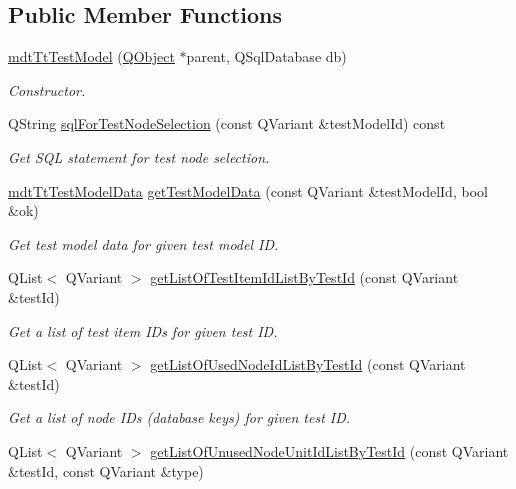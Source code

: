 \subsection*{Public Member Functions}
\begin{DoxyCompactItemize}
\item 
\hyperlink{classmdt_tt_test_model_aa21b9dd55ddc60ee59a5d804e45a163a}{mdt\-Tt\-Test\-Model} (\hyperlink{class_q_object}{Q\-Object} $\ast$parent, Q\-Sql\-Database db)
\begin{DoxyCompactList}\small\item\em Constructor. \end{DoxyCompactList}\item 
Q\-String \hyperlink{classmdt_tt_test_model_a1c7dd9400f00516e054befbf4de53dbb}{sql\-For\-Test\-Node\-Selection} (const Q\-Variant \&test\-Model\-Id) const 
\begin{DoxyCompactList}\small\item\em Get S\-Q\-L statement for test node selection. \end{DoxyCompactList}\item 
\hyperlink{classmdt_tt_test_model_data}{mdt\-Tt\-Test\-Model\-Data} \hyperlink{classmdt_tt_test_model_a746b75259f66e2db65e93d5f58e3d65b}{get\-Test\-Model\-Data} (const Q\-Variant \&test\-Model\-Id, bool \&ok)
\begin{DoxyCompactList}\small\item\em Get test model data for given test model I\-D. \end{DoxyCompactList}\item 
Q\-List$<$ Q\-Variant $>$ \hyperlink{classmdt_tt_test_model_ae9845c11407a0b1db1e37fc40b6ae8b0}{get\-List\-Of\-Test\-Item\-Id\-List\-By\-Test\-Id} (const Q\-Variant \&test\-Id)
\begin{DoxyCompactList}\small\item\em Get a list of test item I\-Ds for given test I\-D. \end{DoxyCompactList}\item 
Q\-List$<$ Q\-Variant $>$ \hyperlink{classmdt_tt_test_model_ade332c342894ccfc87bb901427a9d440}{get\-List\-Of\-Used\-Node\-Id\-List\-By\-Test\-Id} (const Q\-Variant \&test\-Id)
\begin{DoxyCompactList}\small\item\em Get a list of node I\-Ds (database keys) for given test I\-D. \end{DoxyCompactList}\item 
Q\-List$<$ Q\-Variant $>$ \hyperlink{classmdt_tt_test_model_af3641e8ec4479fa63b0fd01dd6548a72}{get\-List\-Of\-Unused\-Node\-Unit\-Id\-List\-By\-Test\-Id} (const Q\-Variant \&test\-Id, const Q\-Variant \&type)

\end{DoxyCompactItemize}
